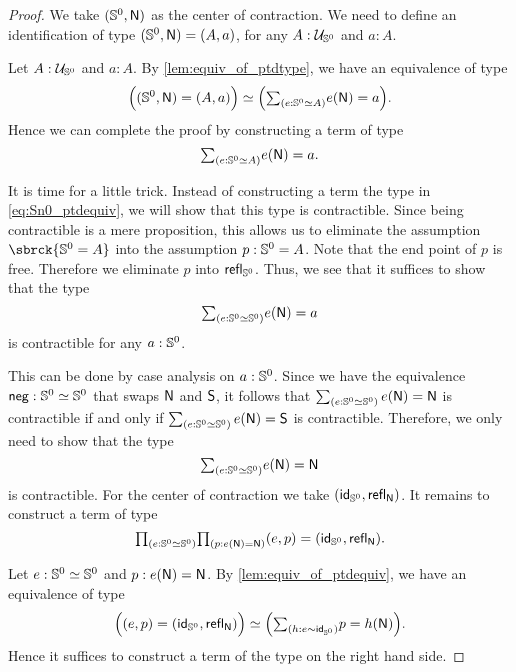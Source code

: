 \begin{proof}
We take $\pairr{\sphere{0},\north}$ as the center of contraction. We need to define
an identification of type $\pairr{\sphere{0},\north}=\pairr{A,a}$, 
for any $A:\UU_{\sphere{0}}$ and $a:A$. 

Let $A:\UU_{\sphere{0}}$ and $a:A$. By \autoref{lem:equiv_of_ptdtype}, we have
an equivalence of type
\begin{equation*}
\eqv{\Big(\pairr{\sphere{0},\north}=\pairr{A,a}\Big)}{\Big(\sm{e:\eqv{\sphere{0}}{A}}e(\north)=a\Big)}.
\end{equation*}
Hence we can complete the proof by constructing a term of type 
\begin{equation}\label{eq:Sn0_ptdequiv}
\sm{e:\eqv{\sphere{0}}{A}}e(\north)=a.
\end{equation} 

It is time for a little trick. Instead of constructing a term the type in
\autoref{eq:Sn0_ptdequiv}, we will show that this type is contractible.
Since being contractible is a mere proposition, 
this allows us to eliminate the assumption $\sbrck{\sphere{0}=A}$
into the assumption $p:\sphere{0}=A$. Note that the end point of $p$ is free.
Therefore we eliminate $p$ into $\refl{\sphere{0}}$. 
Thus, we see that it suffices to show that the type
\begin{equation*}
\sm{e:\eqv{\sphere{0}}{\sphere{0}}}e(\north)=a
\end{equation*}
is contractible for any $a:\sphere{0}$. 

This can be done by case analysis on $a:\sphere{0}$. Since we have the equivalence
$\bneg:\eqv{\sphere{0}}{\sphere{0}}$ that swaps $\north$ and $\south$, it follows
that $\sm{e:\eqv{\sphere{0}}{\sphere{0}}}e(\north)=\north$ is contractible if and only
if $\sm{e:\eqv{\sphere{0}}{\sphere{0}}}e(\north)=\south$ is contractible. Therefore, we
only need to show that the type
\begin{equation*}
\sm{e:\eqv{\sphere{0}}{\sphere{0}}}e(\north)=\north
\end{equation*}
is contractible. 
For the center of contraction we take $\pairr{\idfunc[\sphere{0}],\refl{\north}}$.
It remains to construct a term of type
\begin{equation*}
\prd{e:\eqv{\sphere{0}}{\sphere{0}}}{p:e(\north)=\north} \pairr{e,p}=\pairr{\idfunc[\sphere{0}],\refl{\north}}.
\end{equation*} 

Let $e:\eqv{\sphere{0}}{\sphere{0}}$ and $p:e(\north)=\north$.
By \autoref{lem:equiv_of_ptdequiv}, we have an equivalence of type
\begin{equation*}
\eqv{\Big(\pairr{e,p}=\pairr{\idfunc[\sphere{0}],\refl{\north}}\Big)}
    {\Big(\sm{h:e\htpy \idfunc[\sphere{0}]} p=h(\north)\Big)}.
\end{equation*}
Hence it suffices
to construct a term of the type on the right hand side.


\end{proof}
